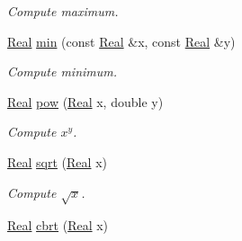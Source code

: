\begin{DoxyCompactItemize}
\begin{DoxyCompactList}\small\item\em Compute maximum. \end{DoxyCompactList}\item 
\hypertarget{namespaceSpacy_ab0a9ae2652cc3a2701e33c6291c4c34a}{}\hyperlink{classSpacy_1_1Real}{Real} \hyperlink{namespaceSpacy_ab0a9ae2652cc3a2701e33c6291c4c34a}{min} (const \hyperlink{classSpacy_1_1Real}{Real} \&x, const \hyperlink{classSpacy_1_1Real}{Real} \&y)\label{namespaceSpacy_ab0a9ae2652cc3a2701e33c6291c4c34a}

\begin{DoxyCompactList}\small\item\em Compute minimum. \end{DoxyCompactList}\item 
\hypertarget{namespaceSpacy_acffef7eb409609abe7ad87aaad28503f}{}\hyperlink{classSpacy_1_1Real}{Real} \hyperlink{namespaceSpacy_acffef7eb409609abe7ad87aaad28503f}{pow} (\hyperlink{classSpacy_1_1Real}{Real} x, double y)\label{namespaceSpacy_acffef7eb409609abe7ad87aaad28503f}

\begin{DoxyCompactList}\small\item\em Compute $x^y$. \end{DoxyCompactList}\item 
\hypertarget{namespaceSpacy_aa779bb3e2bf547cd0ed9ef47b3d711a3}{}\hyperlink{classSpacy_1_1Real}{Real} \hyperlink{namespaceSpacy_aa779bb3e2bf547cd0ed9ef47b3d711a3}{sqrt} (\hyperlink{classSpacy_1_1Real}{Real} x)\label{namespaceSpacy_aa779bb3e2bf547cd0ed9ef47b3d711a3}

\begin{DoxyCompactList}\small\item\em Compute $\sqrt{x}$. \end{DoxyCompactList}\item 
\hypertarget{namespaceSpacy_a64093cc47f73b71ba92bc0dd37e9572b}{}\hyperlink{classSpacy_1_1Real}{Real} \hyperlink{namespaceSpacy_a64093cc47f73b71ba92bc0dd37e9572b}{cbrt} (\hyperlink{classSpacy_1_1Real}{Real} x)\label{namespaceSpacy_a64093cc47f73b71ba92bc0dd37e9572b}


\end{DoxyCompactItemize}
